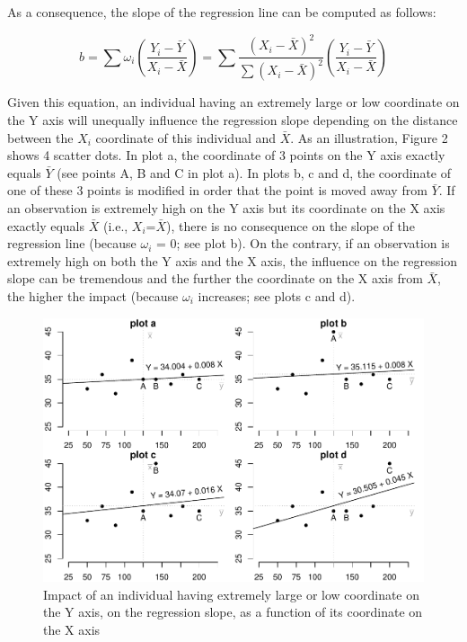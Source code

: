 \documentclass[man,floatsintext]{apa6}
\begin{document}
As a consequence, the slope of the regression line can be computed as follows:

\begin{equation} 
b=\sum\omega_i\left(\frac{Y_i-\bar{Y}}{ X_i-\bar{X}}\right)= \sum \frac{(X_i-\bar{X})^2}{\sum(X_i-\bar{X})^2} \left(\frac{Y_i-\bar{Y}}{X_i-\bar{X}}\right)
\label{eq:regressionslope}
\end{equation}

Given this equation, an individual having an extremely large or low coordinate on the Y axis will unequally influence the regression slope depending on the distance between the \(X_i\) coordinate of this individual and \(\bar{X}\). As an illustration, Figure 2 shows 4 scatter dots. In plot a, the coordinate of 3 points on the Y axis exactly equals \(\bar{Y}\) (see points A, B and C in plot a). In plots b, c and d, the coordinate of one of these 3 points is modified in order that the point is moved away from \(\bar{Y}\). If an observation is extremely high on the Y axis but its coordinate on the X axis exactly equals \(\bar{X}\) (i.e., \(X_i\)=\(\bar{X}\)), there is no consequence on the slope of the regression line (because \(\omega_i\) = 0; see plot b). On the contrary, if an observation is extremely high on both the Y axis and the X axis, the influence on the regression slope can be tremendous and the further the coordinate on the X axis from \(\bar{X}\), the higher the impact (because \(\omega_i\) increases; see plots c and d).

\begin{figure}
\centering
\includegraphics{Outliers_files/figure-latex/outimpact-1.pdf}
\caption{\label{fig:outimpact}Impact of an individual having extremely large or low coordinate on the Y axis, on the regression slope, as a function of its coordinate on the X axis}
\end{figure}
\end{document}
